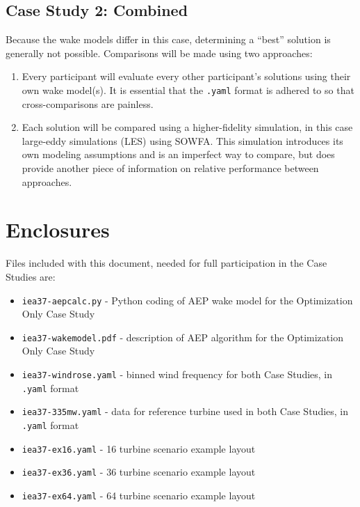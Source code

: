 \documentclass[10pt]{article}
\begin{document}
    \subsection{Case Study 2: Combined}

        Because the wake models differ in this case, determining a ``best'' solution is generally not possible.  Comparisons will be made using two approaches:
        \begin{enumerate}
            \item Every participant will evaluate every other participant's solutions using their own wake model(s).  It is essential that the \texttt{.yaml} format is adhered to so that cross-comparisons are painless. %
            \item Each solution will be compared using a higher-fidelity simulation, in this case large-eddy simulations (LES) using SOWFA.  This simulation introduces its own modeling assumptions and is an imperfect way to compare, but does provide another piece of information on relative performance between approaches. %
        \end{enumerate}

\section{Enclosures}
    Files included with this document, needed for full participation in the Case Studies are:

    \begin{itemize}[noitemsep,topsep=0pt,parsep=0pt,partopsep=0pt]
        \item \texttt{iea37-aepcalc.py} - Python coding of AEP wake model for the Optimization Only Case Study
        \item \texttt{iea37-wakemodel.pdf} - description of AEP algorithm for the Optimization Only Case Study
        \item \texttt{iea37-windrose.yaml} - binned wind frequency for both Case Studies, in \texttt{.yaml} format
        \item \texttt{iea37-335mw.yaml} - data for reference turbine used in both Case Studies, in \texttt{.yaml} format
        \item \texttt{iea37-ex16.yaml} - 16 turbine scenario example layout
        \item \texttt{iea37-ex36.yaml} - 36 turbine scenario example layout
        \item \texttt{iea37-ex64.yaml} - 64 turbine scenario example layout
    \end{itemize}



\end{document}
